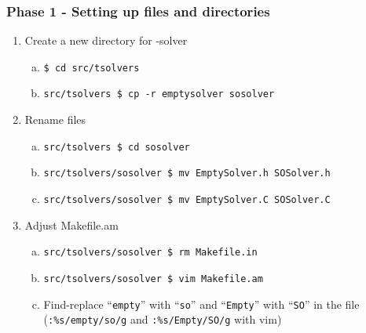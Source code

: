 \begin{frame}[fragile]
  \frametitle{Phase 1 - Setting up files and directories}

  \begin{enumerate}[1.]

    \item Create a new directory for \So-solver

    \begin{enumerate}[a.]

      \item \verb|$ cd src/tsolvers|

      \item \verb|src/tsolvers $ cp -r emptysolver sosolver|

    \end{enumerate}

    \vfill\pause

    \item Rename files

    \begin{enumerate}[a.]

      \item \verb|src/tsolvers $ cd sosolver|

      \item \verb|src/tsolvers/sosolver $ mv EmptySolver.h SOSolver.h|

      \item \verb|src/tsolvers/sosolver $ mv EmptySolver.C SOSolver.C|

    \end{enumerate}

    \vfill\pause

    \item Adjust Makefile.am

    \begin{enumerate}[a.]

      \item \verb|src/tsolvers/sosolver $ rm Makefile.in|

      \item \verb|src/tsolvers/sosolver $ vim Makefile.am|

      \item Find-replace ``\verb|empty|'' with ``\verb|so|'' and 
            ``\verb|Empty|'' with ``\verb|SO|''
	    in the file (\verb|:%s/empty/so/g| and \verb|:%s/Empty/SO/g| with vim)

    \end{enumerate}

  \end{enumerate}

\end{frame}


